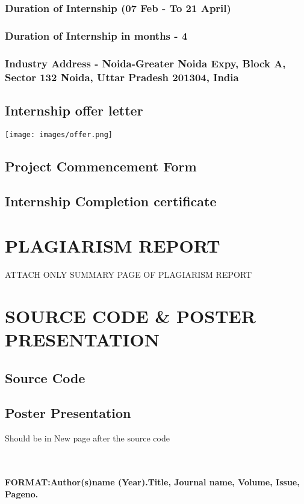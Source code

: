 \documentclass[10pt]{report}
\begin{document}
\subsection{Duration of Internship (07 Feb - To 21 April)}
\subsection{Duration of Internship in months - 4}
\subsection{Industry Address - Noida-Greater Noida Expy, Block A, Sector 132 Noida, Uttar Pradesh 201304, India}
\section{Internship offer letter}
 \texttt{[image: images/offer.png]}
\section{Project Commencement Form}
\section{Internship Completion certificate}


\chapter{PLAGIARISM REPORT}
ATTACH ONLY SUMMARY PAGE OF PLAGIARISM REPORT

\chapter{SOURCE CODE \& POSTER PRESENTATION}
\section{Source Code}

\section{Poster Presentation}
Should be in New page after the source code

\renewcommand\bibname{References}


\begin{thebibliography}{9}
 \\\\ \textbf{FORMAT:Author(s)name (Year).Title, Journal name, Volume,
Issue, Pageno.}\\
\end{thebibliography}
\newpage
\end{document}
